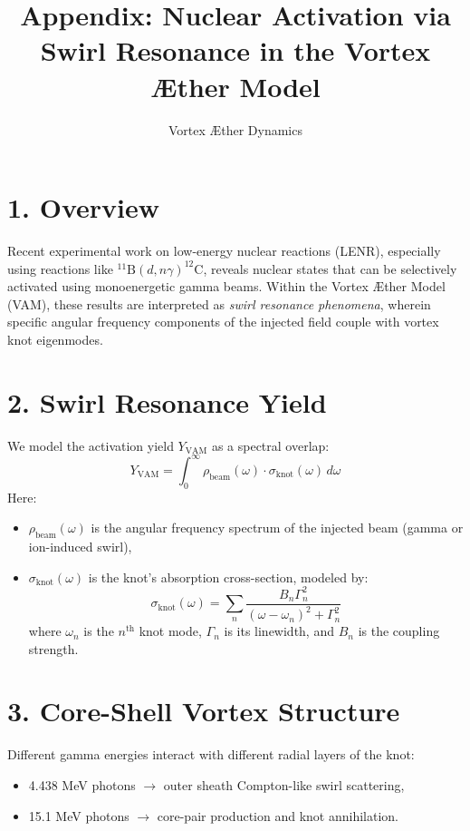 \documentclass{article}
\title{Appendix: Nuclear Activation via Swirl Resonance in the Vortex \AE ther Model}
\author{Vortex \AE ther Dynamics}
\date{}
\begin{document}
\maketitle

\section*{1. Overview}
Recent experimental work on low-energy nuclear reactions (LENR), especially using reactions like $^{11}\mathrm{B}(d,n\gamma)^{12}\mathrm{C}$, reveals nuclear states that can be selectively activated using monoenergetic gamma beams. Within the Vortex \AE ther Model (VAM), these results are interpreted as \textit{swirl resonance phenomena}, wherein specific angular frequency components of the injected field couple with vortex knot eigenmodes.

\section*{2. Swirl Resonance Yield}
We model the activation yield $Y_{\mathrm{VAM}}$ as a spectral overlap:
\[
Y_{\mathrm{VAM}} = \int_0^\infty \rho_{\mathrm{beam}}(\omega) \cdot \sigma_{\mathrm{knot}}(\omega) \, d\omega
\]
Here:
\begin{itemize}
  \item $\rho_{\mathrm{beam}}(\omega)$ is the angular frequency spectrum of the injected beam (gamma or ion-induced swirl),
  \item $\sigma_{\mathrm{knot}}(\omega)$ is the knot's absorption cross-section, modeled by:
  \[
  \sigma_{\mathrm{knot}}(\omega) = \sum_n \frac{B_n \Gamma_n^2}{(\omega - \omega_n)^2 + \Gamma_n^2}
  \]
  where $\omega_n$ is the $n^{\text{th}}$ knot mode, $\Gamma_n$ is its linewidth, and $B_n$ is the coupling strength.
\end{itemize}

\section*{3. Core-Shell Vortex Structure}
Different gamma energies interact with different radial layers of the knot:
\begin{itemize}
  \item 4.438 MeV photons $\rightarrow$ outer sheath Compton-like swirl scattering,
  \item 15.1 MeV photons $\rightarrow$ core-pair production and knot annihilation.
\end{itemize}
\end{document}
